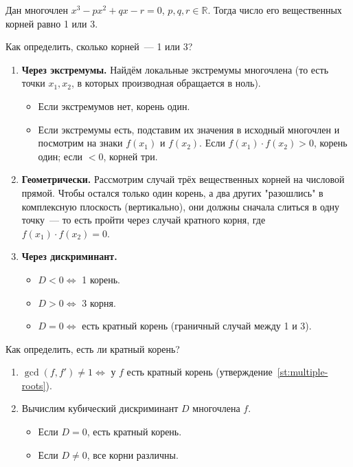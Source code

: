 \documentclass[12pt]{article}
\begin{document}
    \begin{statement}
    	Дан многочлен $x^3 - px^2 + qx - r = 0$, $p, q, r \in \mathbb{R}$. Тогда число его вещественных корней равно 1 или 3.
    	
    	Как определить, сколько корней~--- 1 или 3?
    	
    	\begin{enumerate}
    		\item \textbf{Через экстремумы.} Найдём локальные экстремумы многочлена (то есть точки $x_1, x_2$, в которых производная обращается в ноль).
    		\begin{itemize}
    			\item Если экстремумов нет, корень один.
    			\item Если экстремумы есть, подставим их значения в исходный многочлен и посмотрим на знаки $f(x_1)$ и $f(x_2)$. Если $f(x_1) \cdot f(x_2) > 0$, корень один; если $< 0$, корней три.
    		\end{itemize}
    		\item \textbf{Геометрически.} Рассмотрим случай трёх вещественных корней на числовой прямой. Чтобы остался только один корень, а два других "разошлись" в комплексную плоскость (вертикально), они должны сначала слиться в одну точку~--- то есть пройти через случай кратного корня, где $f(x_1) \cdot f(x_2) = 0$.
    		\item \textbf{Через дискриминант.}
    		\begin{itemize}
    			\item $D < 0 \Leftrightarrow$ 1 корень.
    			\item $D > 0 \Leftrightarrow$ 3 корня.
    			\item $D = 0 \Leftrightarrow$ есть кратный корень (граничный случай между 1 и 3).
    		\end{itemize}
    	\end{enumerate}
    	
    	Как определить, есть ли кратный корень?
    	
    	\begin{enumerate}
    		\item $\gcd(f, f') \ne 1 \Leftrightarrow$ у $f$ есть кратный корень (утверждение~\ref{st:multiple-roots}).
    		\item Вычислим кубический дискриминант $D$ многочлена $f$.
    		\begin{itemize}
    			\item Если $D = 0$, есть кратный корень.
    			\item Если $D \ne 0$, все корни различны.
    		\end{itemize}
    	\end{enumerate}
    \end{statement}
    
\end{document}
